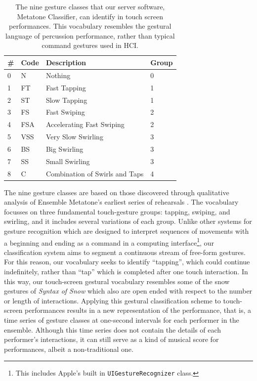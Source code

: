 \documentclass[graybox]{svmult}
\begin{document}
\begin{table}
\begin{center}
    \begin{tabular}{|l|l|l|l|}
    \hline
    \# & Code & Description & Group \\ \hline
    0 & N   & Nothing & 0 \\
    1 & FT  & Fast Tapping & 1\\
    2 & ST  & Slow Tapping & 1\\
    3 & FS  & Fast Swiping & 2\\
    4 & FSA & Accelerating Fast Swiping & 2\\
    5 & VSS & Very Slow Swirling & 3\\
    6 & BS  & Big Swirling & 3\\
    7 & SS  & Small Swirling & 3\\
    8 & C   & Combination of Swirls and Taps & 4\\ \hline
    \end{tabular}
\end{center}
\caption{The nine gesture classes that our server software, Metatone
  Classifier, can identify in touch screen performances. This
  vocabulary resembles the gestural language of percussion
  performance, rather than typical command gestures used in HCI.}
\label{tab:gesture-classes}
\end{table}

The nine gesture classes are based on those discovered through
qualitative analysis of Ensemble Metatone's earliest series of
rehearsals \citep{Martin:2014jk}. The vocabulary focusses on three
fundamental touch-gesture groups: tapping, swiping, and swirling, and
it includes several variations of each group. Unlike other systems for
gesture recognition \citep{Wobbrock:2007kq} which are designed to
interpret sequences of movements with a beginning and ending as a
command in a computing interface\footnote{This includes Apple's built
  in \texttt{UIGestureRecognizer} \citep{AppleDeveloper:2015rm}
  class.}, our classification system aims to segment a continuous
stream of free-form gestures. For this reason, our vocabulary seeks to
identify ``tapping'', which could continue indefinitely, rather than
``tap'' which is completed after one touch interaction. In this way,
our touch-screen gestural vocabulary resembles some of the snow
gestures of \emph{Syntax of Snow} \citep{Burtner:2011fk} which also are
open ended with respect to the number or length of interactions.
Applying this gestural classification scheme to touch-screen
performances results in a new representation of the performance, that
is, a time series of gesture classes at one-second intervals for each
performer in the ensemble. Although this time series does not contain
the details of each performer's interactions, it can still serve as a
kind of musical score for performances, albeit a non-traditional one.
\end{document}
